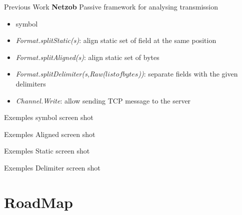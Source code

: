 \documentclass{beamer}
\newcounter{m} %
\newcounter{c} %
\begin{document}
\begin{frame}{Previous Work \textbf{Netzob}}
Passive framework for analysing transmission
\begin{itemize}
\item symbol
\item \textit{Format.splitStatic(s)}: align static set of field at the same position
\item \textit{Format.splitAligned(s)}: align static set of bytes 
\item \textit{Format.splitDelimiter(s,Raw($listofbytes$))}: separate fields with the given delimiters
\item \textit{Channel.Write}: allow sending TCP message to the server
\end{itemize}


\end{frame}

\begin{frame}{Exemples}
symbol screen shot
\end{frame}

\begin{frame}{Exemples}
Aligned screen shot
\end{frame}

\begin{frame}{Exemples}
Static screen shot
\end{frame}

\begin{frame}{Exemples}
Delimiter screen shot
\end{frame}

\section{RoadMap}
\begin{frame}

	\tableofcontents[currentsection]
\end{frame}
\end{document}
